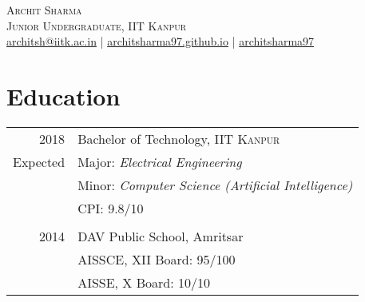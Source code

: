 \documentclass[a4paper,10pt]{article}
\begin{document}

\pagestyle{empty} %


\par{\centering
		{\hspace{-2mm}\Huge \textsc{Archit Sharma}
	}\\\large \textsc{Junior Undergraduate, IIT Kanpur}\\\normalsize \Letter\hspace{1mm}\href{mailto:architsh@iitk.ac.in}{architsh@iitk.ac.in} | \Mundus\hspace{1mm}\href{https://architsharma97.github.io/}{ architsharma97.github.io} | \faGithub \hspace{0mm} \href{https://github.com/architsharma97/}{architsharma97} \bigskip\par}
	
\section{Education}
\begin{tabular}{rl}	
\textsc{2018} & \large Bachelor of Technology, \textsc{IIT Kanpur}\\
Expected & {Major}: \textit{Electrical Engineering} \\
         & {Minor}: \textit{Computer Science (Artificial Intelligence)}\\ 
         & {CPI}: \textsc{9.8/10} \\
         & \\
\textsc{2014} & \large DAV Public School, Amritsar\\
              & AISSCE, XII Board: 95/100\\
              & AISSE, X Board: 10/10\\
\end{tabular}
\end{document}
